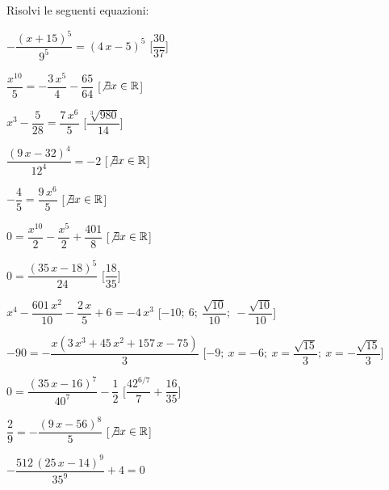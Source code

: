 \begin{esercizio}\label{ese:03.1}
Risolvi le seguenti equazioni:
\begin{enumeratea}
\item \(-{\dfrac{ \left( x+15 \right) ^{5}}{9^5}}= \left( 4\,x-5 \right) 
^{5}\) 
\hfill [\(\dfrac{30}{37}\)]
\item \({\dfrac{{x}^{10}}{5}}=-{\dfrac{3\,{x}^{5}}{4}}-{\dfrac{65}{64}}\) 
\hfill [\(\not\exists x \in \mathbb{R}\)]
\item \({x}^{3}-{\dfrac{5}{28}}={\dfrac{7\,{x}^{6}}{5}}\) 
\hfill [\(\dfrac{\sqrt [3]{980}}{14}\)]
\item \({\dfrac{ \left( 9\,x-32 \right) ^{4}}{12^4}}=-2\) 
\hfill [\(\not\exists x \in \mathbb{R}\)]
\item \(-{\dfrac{4}{5}}={\dfrac{9\,{x}^{6}}{5}}\) 
\hfill [\(\not\exists x \in \mathbb{R}\)]
\item \(0={\dfrac{{x}^{10}}{2}}-{\dfrac{{x}^{5}}{2}}+{\dfrac{401}{8}}\) 
\hfill [\(\not\exists x \in \mathbb{R}\)]
\item \(0={\dfrac{ \left( 35\,x-18 \right) ^{5}}{24}}\) 
\hfill [\(\dfrac{18}{35}\)]
\item \({x}^{4}-{\dfrac{601\,{x}^{2}}{10}}-{\dfrac
{2\,x}{5}}+6=-4\,{x}^{3}\) 
\hfill [\(-10;~6;~{\dfrac{\sqrt {10}}{10}};~
-{\dfrac{\sqrt {10}}{10}}\)]
\item \(-90=-{\dfrac{x \left( 3\,{x}^{3}+45\,{x}^{2}+157\,x-75 \right) 
}{3}}\) 
\hfill [\(-9;~x=-6;~x={\dfrac{\sqrt {15}}{3}};~x=-{\dfrac{\sqrt{15}}{3}}\)]
\item \(0={\dfrac{ \left( 35\,x-16 \right) ^{7}}{40^7}}-{\dfrac{1}{2}}\) 
\hfill [\({\dfrac{4 {2}^{6/7}}{7}}+{\dfrac{16}{35}}\)]
\item \({\dfrac{2}{9}}=-{\dfrac{ \left( 9\,x-56 \right) ^{8}}{5}}\) 
\hfill [\(\not\exists x \in \mathbb{R}\)]
\item \(-{\dfrac{512\, \left( 25\,x-14 \right) ^{9}}{35^9}}+4=0\) 

\end{enumeratea}
\end{esercizio}
